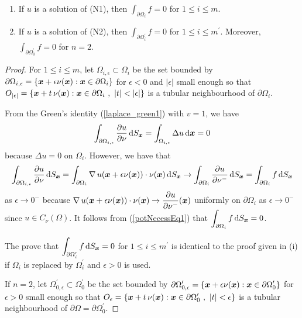 \begin{prop} \label{pot_nec_Nprobl}
\begin{enumerate}
\item If $u$ is a solution of (N1), then
$\displaystyle \int_{\partial \Omega_i} f =0$ for $1 \leq i \leq m$.
\item If $u$ is a solution of (N2), then
$\displaystyle \int_{\partial \Omega^{\prime}_i} f =0$ for
$\displaystyle 1 \leq i \leq m^{\prime}$.
Moreover, $\displaystyle \int_{\partial \Omega^{\prime}_0} f =0$ for $n=2$.
\end{enumerate}
\end{prop}

\begin{proof}
For $1\leq i \leq m$, let $\Omega_{i,\epsilon} \subset \Omega_i$ be
the set bounded by
$\displaystyle \partial \Omega_{i,\epsilon}
= \{{\bm{x}} + \epsilon \nu({\bm{x}}) : {\bm{x}}
\in \partial \Omega_i \}$ for $\epsilon<0$ and $|\epsilon|$ small
enough so that
$\displaystyle
O_{|\epsilon|} = \left\{ \VEC{x} + t\, \nu(\VEC{x}) : \VEC{x} \in
  \partial \Omega_i \ , \ |t|<|\epsilon| \right\}$ is a tubular
neighbourhood of $\partial \Omega_i$.

From the Green's identity (\ref{laplace_green1}) with $v=1$, we have
\begin{equation} \label{potNecessEq1}
\int_{\partial \Omega_{i,\epsilon}} \frac{\partial{u}}{\partial \nu} \,\mathrm{d}{S}_{{\bm{x}}}
= \int_{\Omega_{i,\epsilon}} \Delta u \,\mathrm{d}{{\bm{x}}} = 0
\end{equation}
because $\Delta u = 0$ on $\Omega_i$.  However, we have that
\[
\int_{\partial \Omega_{i,\epsilon}} \frac{\partial{u}}{\partial \nu} \,\mathrm{d}{S}_{{\bm{x}}}
= \int_{\partial \Omega_i} \operatorname{\nabla} u({\bm{x}} + \epsilon \nu({\bm{x}}))
\cdot \nu({\bm{x}}) \,\mathrm{d}{S}_{{\bm{x}}}
\rightarrow \int_{\partial \Omega_i} \frac{\partial{u}}{\partial \nu^-} \,\mathrm{d}{S}_{{\bm{x}}}
= \int_{\partial \Omega_i} f \,\mathrm{d}{S}_{{\bm{x}}}
\]
as $\epsilon \rightarrow 0^-$ because
$\displaystyle
\operatorname{\nabla} u({\bm{x}} + \epsilon \nu({\bm{x}})) \cdot \nu({\bm{x}})
\to \frac{\partial{u}}{\partial \nu^-}({\bm{x}})$ uniformly on $\partial \Omega_i$ as
$\epsilon \to 0^-$ since $u \in C_{\nu}(\Omega)$.  It follows
from (\ref{potNecessEq1}) that
$\displaystyle \int_{\partial \Omega_i} f \,\mathrm{d}{S}_{{\bm{x}}} = 0$.

 The prove that
$\displaystyle \int_{\partial \Omega^{\prime}_i} f \,\mathrm{d}{S}_{{\bm{x}}} = 0$ for
$\displaystyle 1 \leq i \leq m^{\prime}$ is identical to the proof given in
(i) if $\Omega_i$ is replaced by $\displaystyle \Omega_i^{\prime}$ and
$\epsilon >0$ is used.

If $n=2$, let
$\displaystyle \Omega^{\prime}_{0,\epsilon} \subset \Omega^{\prime}_0$ be
the set bounded by
$\displaystyle \partial \Omega^{\prime}_{0,\epsilon}
= \{ {\bm{x}} + \epsilon \nu({\bm{x}}) :
{\bm{x}} \in \partial \Omega^{\prime}_0 \}$ for $\epsilon>0$ small
enough so that
$\displaystyle
O_{\epsilon} = \left\{ {\bm{x}} + t\, \nu({\bm{x}}) : {\bm{x}} \in
  \partial \Omega_0^{\prime} \ , \ |t|<\epsilon \right\}$ is a tubular
neighbourhood of $\displaystyle \partial \Omega = \partial \Omega^{\prime}_0$.


\end{proof}
